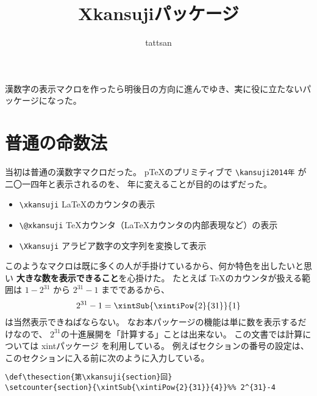 \documentclass[dvipdfmx]{jsarticle}
\title{\textsf{Xkansujiパッケージ}}
\author{tattsan}
\date{}
\begin{document}
\maketitle
漢数字の表示マクロを作ったら明後日の方向に進んでゆき、実に役に立たないパッケージになった。
\def\thesection{第\xkansuji{section}話}
\section{普通の命数法}
当初は普通の漢数字マクロだった。
p\TeX\space のプリミティブで \verb+\kansuji2014年+ が二〇一四年と表示されるのを、
年に変えることが目的のはずだった。
\begin{screen}
\begin{itemize}
\item \verb+\xkansuji+ \LaTeX のカウンタの表示
\item \verb+\@xkansuji+ \TeX カウンタ（\LaTeX カウンタの内部表現など）の表示
\item \verb+\Xkansuji+ アラビア数字の文字列を変換して表示
\end{itemize}  
\end{screen}
このようなマクロは既に多くの人が手掛けているから、何か特色を出したいと思い
\textbf{大きな数を表示できること}を心掛けた。
たとえば \TeX のカウンタが扱える範囲は $1-2^{31}$ から $2^{31}-1$ までであるから、
\[
2^{31}-1=\xintSub{\xintiPow{2}{31}}{1}
\]
は当然表示できねばならない。
なお本パッケージの機能は単に数を表示するだけなので、
$2^{31}$の十進展開を「計算する」ことは出来ない。
この文書では計算については \textsf{xintパッケージ} を利用している。
例えばセクションの番号の設定は、このセクションに入る前に次のように入力している。
\begin{verbatim}
\def\thesection{第\xkansuji{section}回}
\setcounter{section}{\xintSub{\xintiPow{2}{31}}{4}}%% 2^{31}-4
\end{verbatim}
\end{document}
